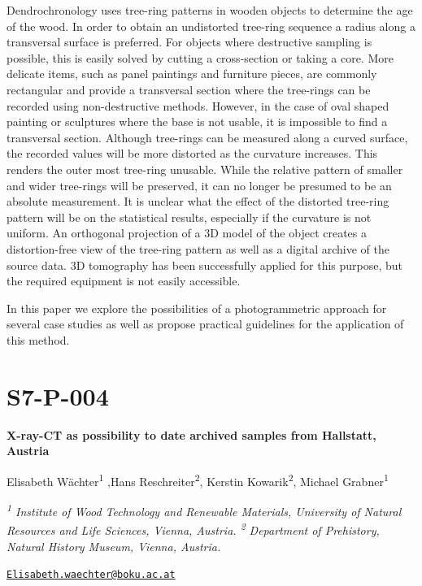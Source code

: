 \documentclass[
]{book}
\begin{document}
Dendrochronology uses tree-ring patterns in wooden objects to determine the age of the wood. In order to obtain an undistorted tree-ring sequence a radius along a transversal surface is preferred. For objects where destructive sampling is possible, this is easily solved by cutting a cross-section or taking a core. More delicate items, such as panel paintings and furniture pieces, are commonly rectangular and provide a transversal section where the tree-rings can be recorded using non-destructive methods. However, in the case of oval shaped painting or sculptures where the base is not usable, it is impossible to find a transversal section. Although tree-rings can be measured along a curved surface, the recorded values will be more distorted as the curvature increases. This renders the outer most tree-ring unusable. While the relative pattern of smaller and wider tree-rings will be preserved, it can no longer be presumed to be an absolute measurement. It is unclear what the effect of the distorted tree-ring pattern will be on the statistical results, especially if the curvature is not uniform. An orthogonal projection of a 3D model of the object creates a distortion-free view of the tree-ring pattern as well as a digital archive of the source data. 3D tomography has been successfully applied for this purpose, but the required equipment is not easily accessible.

In this paper we explore the possibilities of a photogrammetric approach for several case studies as well as propose practical guidelines for the application of this method.

\hypertarget{s7-p-004}{%
\section*{S7-P-004}\label{s7-p-004}}

\textbf{X-ray-CT as possibility to date archived samples from Hallstatt, Austria}

Elisabeth Wächter\textsuperscript{1} ,Hans Reschreiter\textsuperscript{2}, Kerstin Kowarik\textsuperscript{2}, Michael Grabner\textsuperscript{1}

\emph{\textsuperscript{1} Institute of Wood Technology and Renewable Materials, University of Natural Resources and Life Sciences, Vienna, Austria. \textsuperscript{2} Department of Prehistory, Natural History Museum, Vienna, Austria.}

\href{mailto:Elisabeth.waechter@boku.ac.at}{\nolinkurl{Elisabeth.waechter@boku.ac.at}}
\end{document}
